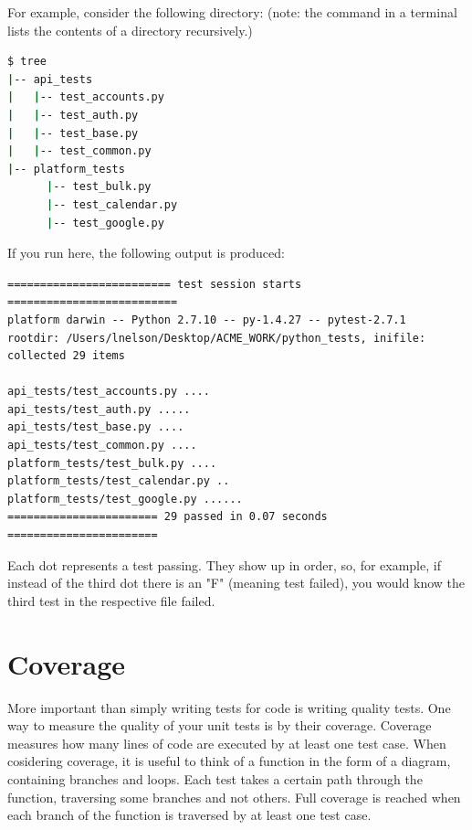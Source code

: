 For example, consider the following directory: (note: the  command in a terminal lists the contents of a directory recursively.)
\begin{lstlisting}[language=bash]
$ tree
|-- api_tests
|   |-- test_accounts.py
|   |-- test_auth.py
|   |-- test_base.py
|   |-- test_common.py
|-- platform_tests
      |-- test_bulk.py
      |-- test_calendar.py
      |-- test_google.py
\end{lstlisting}

If you run  here, the following output is produced:

\begin{lstlisting}
========================= test session starts ==========================
platform darwin -- Python 2.7.10 -- py-1.4.27 -- pytest-2.7.1
rootdir: /Users/lnelson/Desktop/ACME_WORK/python_tests, inifile:
collected 29 items

api_tests/test_accounts.py ....
api_tests/test_auth.py .....
api_tests/test_base.py ....
api_tests/test_common.py ....
platform_tests/test_bulk.py ....
platform_tests/test_calendar.py ..
platform_tests/test_google.py ......
======================= 29 passed in 0.07 seconds =======================
\end{lstlisting}
\begin{info}
Each dot represents a test passing. They show up in order, so, for example, if instead of the third dot there is an "F" (meaning test failed), you would know the third test in the respective file failed.
\end{info}


\section*{Coverage}

More important than simply writing tests for code is writing quality tests. One way to measure the quality of your unit tests is by their coverage. Coverage measures how many lines of code are executed by at least one test case. 
When cosidering coverage, it is useful to think of a function in the form of a diagram, containing branches and loops. Each test takes a certain path through the function, traversing some branches and not others. Full coverage is reached when each branch of the function is traversed by at least one test case.

